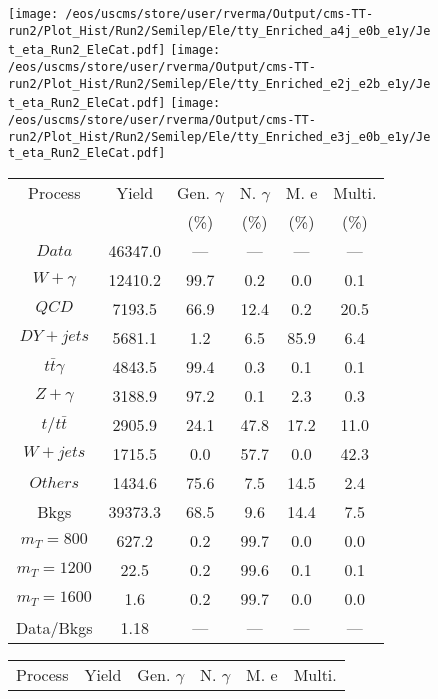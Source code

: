 \begin{figure}
\centering
\texttt{[image: /eos/uscms/store/user/rverma/Output/cms-TT-run2/Plot\_Hist/Run2/Semilep/Ele/tty\_Enriched\_a4j\_e0b\_e1y/Jet\_eta\_Run2\_EleCat.pdf]}
\texttt{[image: /eos/uscms/store/user/rverma/Output/cms-TT-run2/Plot\_Hist/Run2/Semilep/Ele/tty\_Enriched\_e2j\_e2b\_e1y/Jet\_eta\_Run2\_EleCat.pdf]}
\texttt{[image: /eos/uscms/store/user/rverma/Output/cms-TT-run2/Plot\_Hist/Run2/Semilep/Ele/tty\_Enriched\_e3j\_e0b\_e1y/Jet\_eta\_Run2\_EleCat.pdf]}
\begin{minipage}[c]{0.32\textwidth}
\centering
\tiny{
\begin{tabular}{cccccc}
\hline
Process & Yield & Gen. $\gamma$ & N. $\gamma$ & M. e & Multi. \\
 &  & (\%) & (\%) & (\%) & (\%)  \\
\hline
                                                                      $ Data $ &  46347.0 &  --- &  --- &  --- &  ---\\
$ W+\gamma $ &  12410.2 &  99.7 &  0.2 &  0.0 &  0.1\\
$ QCD $ &  7193.5 &  66.9 &  12.4 &  0.2 &  20.5\\
$ DY+jets $ &  5681.1 &  1.2 &  6.5 &  85.9 &  6.4\\
$ t\bar{t}\gamma $ &  4843.5 &  99.4 &  0.3 &  0.1 &  0.1\\
$ Z+\gamma $ &  3188.9 &  97.2 &  0.1 &  2.3 &  0.3\\
$ t/t\bar{t} $ &  2905.9 &  24.1 &  47.8 &  17.2 &  11.0\\
$ W+jets $ &  1715.5 &  0.0 &  57.7 &  0.0 &  42.3\\
$ Others $ &  1434.6 &  75.6 &  7.5 &  14.5 &  2.4\\
Bkgs &  39373.3 &  68.5 &  9.6 &  14.4 &  7.5\\
$ m_{T} = 800 $ &  627.2 &  0.2 &  99.7 &  0.0 &  0.0\\
$ m_{T} = 1200 $ &  22.5 &  0.2 &  99.6 &  0.1 &  0.1\\
$ m_{T} = 1600 $ &  1.6 &  0.2 &  99.7 &  0.0 &  0.0\\
Data/Bkgs &  1.18 &  --- &  --- &  --- &  ---\\
\hline
\end{tabular}
}
\end{minipage}
\begin{minipage}[c]{0.32\textwidth}
\centering
\tiny{
\begin{tabular}{cccccc}
\hline
Process & Yield & Gen. $\gamma$ & N. $\gamma$ & M. e & Multi. \\

\end{tabular}}
\end{minipage}
\end{figure}
